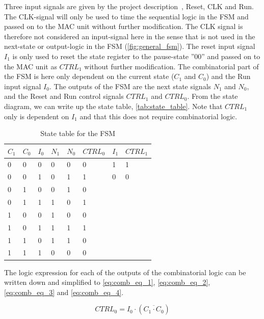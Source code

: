 Three input signals are given by the project description~\cite{project_description}, Reset, CLK and Run. The CLK-signal
will only be used to time the sequential logic in the FSM and passed on to the MAC unit without
further modification. The CLK signal is therefore not considered an input-signal here in the sense that is not used in the next-state or output-logic in the FSM (\autoref{fig:general_fsm}). The reset input signal $I_1$ is only used to reset the state register to the pause-state ''00'' and passed on to the MAC unit as $CTRL_1$ without further modification. The combinatorial part of the FSM is here only dependent on the current state ($C_1$ and $C_0$) and the Run input signal $I_0$. The outputs of the FSM are the next state signals $N_1$ and $N_0$, and the Reset and Run control signals $CTRL_1$ and $CTRL_0$. From the state diagram, we can write up the state table, \autoref{tab:state_table}. Note that $CTRL_1$ only is dependent on $I_1$ and that this does not require combinatorial logic.

\begin{table}[H]
\caption{State table for the FSM}
\label{tab:state_table}
\centering
\begin{tabular}{|l|l|l|l|l|l||l|l|}
\hline
\rowcolor[HTML]{C0C0C0} 
$C_1$ & $C_0$ & $I_0$ & $N_1$ & $N_0$ & $CTRL_0$ & $I_1$ & $CTRL_1$\\
\hline
0  & 0  & 0  & 0   & 0   & 0 & 1 & 1\\ 
\hline
0  & 0  & 1  & 0   & 1   & 1 & 0 & 0\\ 
\hline
0  & 1  & 0  & 0   & 1   & 0 \\ 
\cline{1-6}
0  & 1  & 1  & 1   & 0   & 1 \\ 
\cline{1-6}
1  & 0  & 0  & 1   & 0   & 0 \\ 
\cline{1-6}
1  & 0  & 1  & 1   & 1   & 1 \\ 
\cline{1-6}
1  & 1  & 0  & 1   & 1   & 0 \\ 
\cline{1-6}
1  & 1  & 1  & 0   & 0   & 0 \\ 
\cline{1-6}

\end{tabular}
\end{table}

\noindent
The logic expression for each of the outputs of the combinatorial logic can be written down and simplified to \autoref{eq:comb_eq_1}, \ref{eq:comb_eq_2}, \ref{eq:comb_eq_3} and \ref{eq:comb_eq_4}.

\begin{equation}
\label{eq:comb_eq_1}
    CTRL_0 = I_0\cdot(\overline{C_1 \cdot C_0})
\end{equation}

